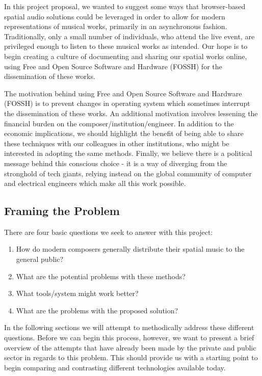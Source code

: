 In this project proposal, we wanted to suggest some ways that browser-based spatial audio solutions could be leveraged in order to allow for modern representations of musical works, primarily in an asynchronous fashion. Traditionally, only a small number of individuals, who attend the live event, are privileged enough to listen to these musical works as intended. Our hope is to begin creating a culture of documenting and sharing our spatial works online, using Free and Open Source Software and Hardware (FOSSH) for the dissemination of these works. 

The motivation behind using Free and Open Source Software and Hardware (FOSSH) is to prevent changes in operating system which sometimes interrupt the dissemination of these works. An additional motivation involves lessening the financial burden on the composer/institution/engineer. In addition to the economic implications, we should highlight the benefit of being able to share these techniques with our colleagues in other institutions, who might be interested in adopting the same methods. Finally, we believe there is a political message behind this conscious choice - it is a way of diverging from the stronghold of tech giants, relying instead on the global community of computer and electrical engineers which make all this work possible. 

\subsection{Framing the Problem}

There are four basic questions we seek to answer with this project: 

\begin{enumerate}
    \item How do modern composers generally distribute their spatial music to the general public?
    \item What are the potential problems with these methods?
    \item What tools/system might work better? 
    \item What are the problems with the proposed solution?
\end{enumerate}
    
In the following sections we will attempt to methodically address these different questions. Before we can begin this process, however, we want to present a brief overview of the attempts that have already been made by the private and public sector in regards to this problem. This should provide us with a starting point to begin comparing and contrasting different technologies available today.


